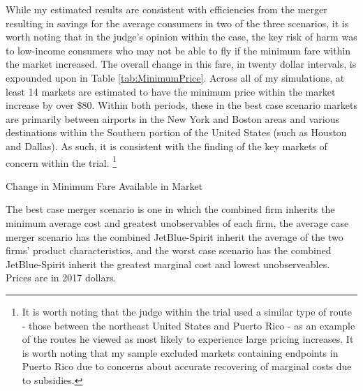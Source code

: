 \documentclass{article}
\begin{document}
    While my estimated results are consistent with efficiencies from the merger resulting in savings for the average consumers in two of the three scenarios, it is worth noting that in the judge's opinion within the case, the key risk of harm was to low-income consumers who may not be able to fly if the minimum fare within the market increased. The overall change in this fare, in twenty dollar intervals, is expounded upon in Table \ref{tab:MinimumPrice}. Across all of my simulations, at least 14 markets are estimated to have the minimum price within the market increase by over \$80. Within both periods, these in the best case scenario markets are primarily between airports in the New York and Boston areas and various destinations within the Southern portion of the United States (such as Houston and Dallas). As such, it is consistent with the finding of the key markets of concern within the trial. \footnote{It is worth noting that the judge within the trial used a similar type of route - those between the northeast United States and Puerto Rico - as an example of the routes he viewed as most likely to experience large pricing increases. It is worth noting that my sample excluded markets containing endpoints in Puerto Rico due to concerns about accurate recovering of marginal costs due to subsidies.} 

    \begin{table}
        \caption{Change in Minimum Fare Available in Market}
        \label{tab:MinimumPrice}
                \vspace{-15mm}
        \begin{center}
            
        \end{center}
        \footnotesize{The best case merger scenario is one in which the combined firm inherits the minimum average cost and greatest unobservables of each firm, the average case merger scenario has the combined JetBlue-Spirit inherit the average of the two firms' product characteristics, and the worst case scenario has the combined JetBlue-Spirit inherit the greatest marginal cost and lowest unobserveables. Prices are in 2017 dollars.}
    \end{table}    
\end{document}
